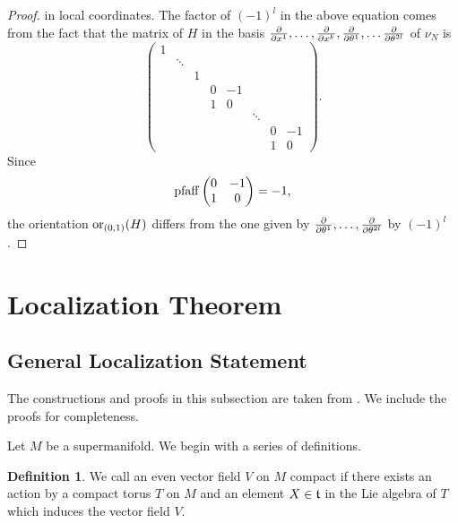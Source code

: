 \documentclass[11pt]{amsart}
\numberwithin{equation}{section}
\numberwithin{figure}{section}
\theoremstyle{plain}
\theoremstyle{definition}
\newtheorem{defn}[thm]{Definition}
\theoremstyle{remark}
\begin{document}
\begin{proof}
in local coordinates. The factor of $(-1)^{l}$ in the above equation
comes from the fact that the matrix of $H$ in the basis $\frac{\partial}{\partial x^{1}},\dots,\frac{\partial}{\partial x^{k}},\frac{\partial}{\partial\theta^{1}},\dots\frac{\partial}{\partial\theta^{2l}}$
of $\nu_{N}$ is 
\[
\left(\begin{matrix}1\\
 & \ddots\\
 &  & 1\\
 &  &  & 0 & -1\\
 &  &  & 1 & 0\\
 &  &  &  &  & \ddots\\
 &  &  &  &  &  & 0 & -1\\
 &  &  &  &  &  & 1 & 0
\end{matrix}\right).
\]
Since 
\[
\mathrm{pfaff}\left(\begin{matrix}0 & -1\\
1 & 0
\end{matrix}\right)=-1,
\]
the orientation $\mathrm{or}_{(0,1)}(H)$ differs from the one given by $\frac{\partial}{\partial\theta^{1}},\dots,\frac{\partial}{\partial\theta^{2l}}$
by $(-1)^{l}$. 
\end{proof}

\section{Localization Theorem\label{sec:Localization-Theorem}}


\subsection{General Localization Statement\label{sub:General-Localization-Statement}}

The constructions and proofs in this subsection are taken from \cite{SuppersymmetryAndLocalization}.
We include the proofs for completeness.

Let $M$ be a supermanifold. We begin with a series of definitions.
\begin{defn}
We call an even vector field $V$ on $M$ compact if there exists
an action by a compact torus $T$ on $M$ and an element $X\in\mathfrak{\mathfrak{t}}$
in the Lie algebra of $T$ which induces the vector field $V$.
\end{defn}
\end{document}
